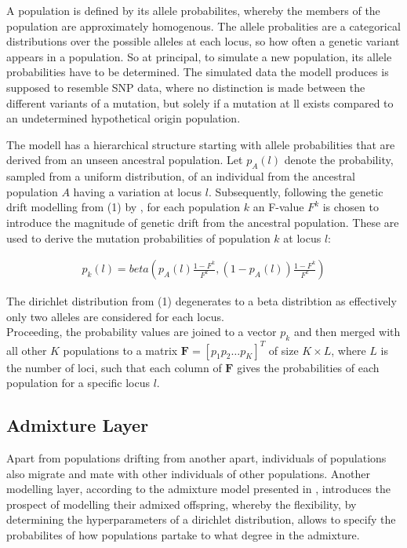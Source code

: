 \documentclass[a4paper, 11pt]{article}
\begin{document}
A population is defined by its allele probabilites, whereby the members of the population are approximately homogenous. The allele probalities are a categorical distributions over the possible alleles at each locus, so how often a genetic variant appears in a population. So at principal, to simulate a new population, its allele probabilities have to be determined. The simulated data the modell produces is supposed to resemble SNP data, where no distinction is made between the different variants of a mutation, but solely if a mutation at ll exists compared to an undetermined hypothetical origin population.

The modell has a hierarchical structure starting with allele probabilities that are derived from an unseen ancestral population. Let $p_{A}(l)$ denote the probability, sampled from a uniform distribution, of an individual from the ancestral population $A$ having a variation at locus $l$. Subsequently, following the genetic drift modelling from (1) by \cite{falush2003inference}, for each population $k$ an F-value $F^{k}$ is chosen to introduce the magnitude of genetic drift from the ancestral population. These are used to derive the mutation probabilities of population $k$ at locus $l$:

\begin{align}
p_{k}(l) = beta(p_{A}(l) \frac{1 - F^k}{F^k}, (1-p_{A}(l)) \frac{1 - F^k}{F^k})
\end{align}

The dirichlet distribution from (1) degenerates to a beta distribtion as effectively only two alleles are considered for each locus. \\

Proceeding, the probability values are joined to a vector $p_k$ and then merged with all other $K$ populations to a matrix $\mathbf{F} = [p_1 p_2 \ldots p_K]^T$ of size $K \times L$, where $L$ is the number of loci, such that each column of $\mathbf{F}$ gives the probabilities of each population for a specific locus $l$. \\

\subsection{Admixture Layer}

Apart from populations drifting from another apart, individuals of populations also migrate and mate with other individuals of other populations. Another modelling layer, according to the admixture model presented in \cite{pritchard2000inference}, introduces the prospect of modelling their admixed offspring, whereby the flexibility, by determining the hyperparameters of a dirichlet distribution, allows to specify the probabilites of how populations partake to what degree in the admixture.
\end{document}
